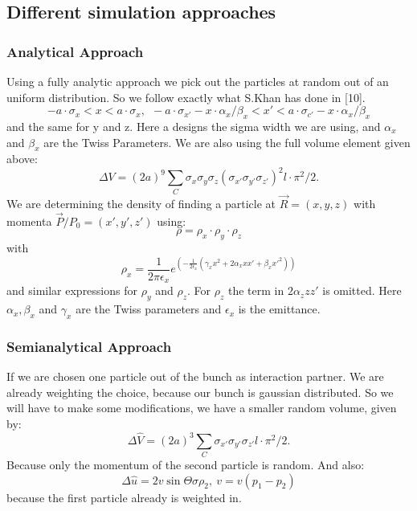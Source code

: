 \subsection{Different simulation approaches}

\subsubsection{Analytical Approach}
Using a fully analytic approach we pick out the particles at random out of an uniform distribution. So we follow exactly what S.Khan has done in [10].
\begin{equation} - a \cdot \sigma_x < x < a \cdot \sigma_x, \ \ -a \cdot \sigma_{x'} - x \cdot \alpha_x / \beta_x < x' <a \cdot \sigma_{c'} - x \cdot \alpha_x / \beta_x \end{equation} 
and the same for y and z. Here a designs the sigma width we are using, and $\alpha_x$ and $\beta_x$ are the Twiss Parameters. We are also using the full volume element given above:
\begin{equation} \Delta V = (2 a)^9 \sum\limits_C \sigma_x \sigma_y \sigma_z (\sigma_{x'} \sigma_{y'} \sigma_{z'})^2 l \cdot \pi^2 / 2. \end{equation}
We are determining the density of finding a particle at $\vec R = (x,y,z)$ with momenta $\vec P / P_0 = (x', y', z')$ using:
\begin{equation} \rho = \rho_x \cdot \rho_y \cdot \rho_z \end{equation}
with
\begin{equation} \rho_x = \frac 1 {2 \pi \epsilon_x} e^{\left(- \frac 1 {2 \epsilon_x}(\gamma_x x^2 + 2 \alpha_x x x' + \beta_x x'^2)\right)} \end{equation}
and similar expressions for $\rho_y$ and $\rho_z$. For $\rho_z$ the term in $2 \alpha_z z z'$ is omitted. Here $\alpha_x, \beta_x$ and $\gamma_x$ are the Twiss parameters and $\epsilon_x$ is the emittance.

\subsubsection{Semianalytical Approach}
If we are chosen one particle out of the bunch as interaction partner. We are already weighting the choice, because our bunch is gaussian distributed. So we will have to make some modifications, we have a smaller random volume, given by:
\begin{equation} \Delta \hat V = (2 a)^3 \sum\limits_C \sigma_{x'} \sigma_{y'} \sigma_{z'} l \cdot \pi^2 / 2. \end{equation}
Because only the momentum of the second particle is random. And also:
\begin{equation} \Delta \hat u = 2 v \sin \Theta \sigma \rho_2, \ v = v(p_1 - p_2) \end{equation}
because the first particle already is weighted in.

